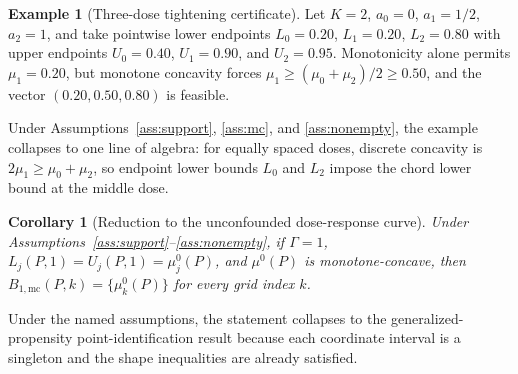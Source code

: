 \documentclass[11pt]{article}
\theoremstyle{definition}
\newtheorem{example}{Example}
\theoremstyle{plain}
\newtheorem{corollary}{Corollary}
\theoremstyle{remark}
\begin{document}
\begin{example}[Three-dose tightening certificate]\label{ex:three-dose}
Let \(K=2\), \(a_0=0\), \(a_1=1/2\), \(a_2=1\), and take pointwise lower endpoints \(L_0=0.20\), \(L_1=0.20\), \(L_2=0.80\) with upper endpoints \(U_0=0.40\), \(U_1=0.90\), and \(U_2=0.95\).  Monotonicity alone permits \(\mu_1=0.20\), but monotone concavity forces \(\mu_1\ge(\mu_0+\mu_2)/2\ge0.50\), and the vector \((0.20,0.50,0.80)\) is feasible.
\end{example}

Under Assumptions~\ref{ass:support}, \ref{ass:mc}, and \ref{ass:nonempty}, the example collapses to one line of algebra: for equally spaced doses, discrete concavity is \(2\mu_1\ge\mu_0+\mu_2\), so endpoint lower bounds \(L_0\) and \(L_2\) impose the chord lower bound at the middle dose.

\begin{corollary}[Reduction to the unconfounded dose-response curve]\label{cor:unconfounded}
Under Assumptions~\ref{ass:support}--\ref{ass:nonempty}, if \(\Gamma=1\), \(L_j(P,1)=U_j(P,1)=\mu^0_j(P)\), and \(\mu^0(P)\) is monotone-concave, then \(B_{1,\mathrm{mc}}(P,k)=\{\mu^0_k(P)\}\) for every grid index \(k\).
\end{corollary}

Under the named assumptions, the statement collapses to the generalized-propensity point-identification result because each coordinate interval is a singleton and the shape inequalities are already satisfied.
\end{document}
